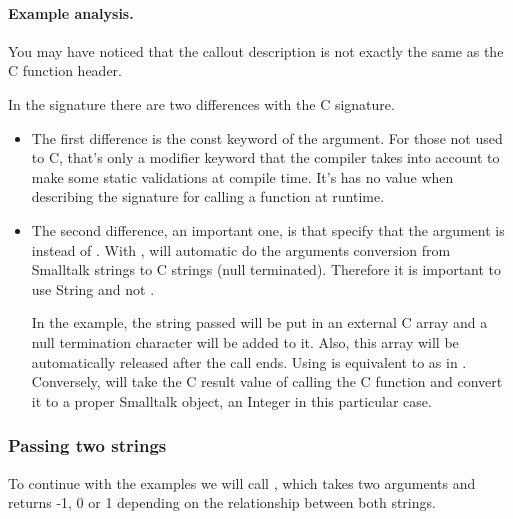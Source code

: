 \documentclass[a4paper,10pt,twoside]{book}
\begin{document}
\paragraph{Example analysis.} You may have noticed that the callout description is not exactly the same as the C function header. 

In the signature  there are two differences with the C signature. 
\begin{itemize}
\item  The first difference is the const keyword of the argument. For those not used to C, 
that's only a modifier keyword that the compiler takes into account to
make some static validations at compile time. It's has no
value when describing the signature for calling a function at
runtime.

\item The second difference, an important one, is that specify that the argument is  instead of . 
With , \Spock will automatic do the arguments conversion from Smalltalk strings to C strings (null terminated).
Therefore it is important to use String and not . 

In the example, the string passed will be put in an external C  array and a null termination character will be added to it. 
Also, this array will be automatically released after the call ends. Using  is equivalent to  as in . Conversely, \Spock
will take the C result value of calling the C function and convert it to a proper Smalltalk object, an Integer in this particular case.
\end{itemize}


\subsubsection{Passing two strings}
To continue with the examples we will call , which takes
two arguments and returns -1, 0 or 1 depending on the relationship
between both strings.
\end{document}
